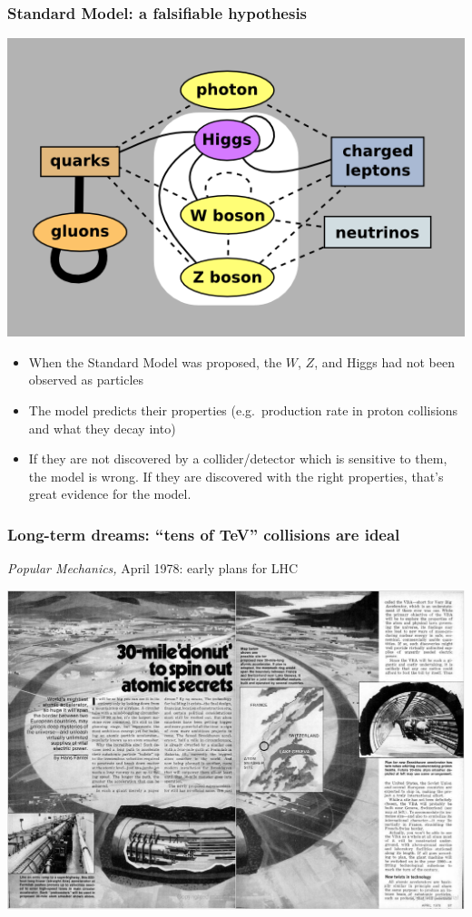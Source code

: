 \documentclass[compress]{beamer}
\begin{document}
\begin{frame}
\frametitle{Standard Model: a falsifiable hypothesis}

\begin{center}
\includegraphics[width=0.6\linewidth]{standard_model_undiscovered.png}
\end{center}

\begin{itemize}
\item When the Standard Model was proposed, the $W$, $Z$, and Higgs
  had not been observed as particles

\item The model predicts their properties (e.g.\ production rate in
  proton collisions and what they decay into)

\item If they are not discovered by a collider/detector which is
  sensitive to them, the model is wrong.  If they are discovered with
  the right properties, that's great evidence for the model.
\end{itemize}
\end{frame}

\begin{frame}
\frametitle{Long-term dreams: ``tens of TeV'' collisions are ideal}

{\it Popular Mechanics,} April 1978: early plans for LHC

\vfill
\includegraphics[width=\linewidth]{popular_mechanics.png}
\end{frame}
\end{document}
